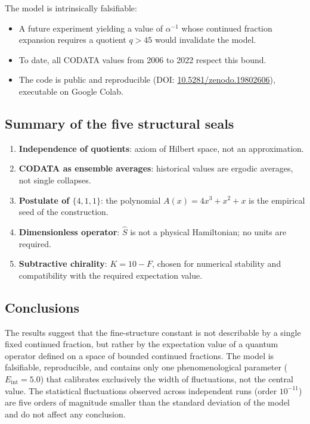 \documentclass[12pt]{article}
\begin{document}
The model is intrinsically falsifiable:

\begin{itemize}
    \item A future experiment yielding a value of $\alpha^{-1}$ whose continued fraction expansion requires a quotient $q > 45$ would invalidate the model.
    \item To date, all CODATA values from 2006 to 2022 respect this bound.
    \item The code is public and reproducible (DOI: \href{https://doi.org/10.5281/zenodo.19802606}{10.5281/zenodo.19802606}), executable on Google Colab.
\end{itemize}

\subsection*{Summary of the five structural seals}

\begin{enumerate}
    \item \textbf{Independence of quotients}: axiom of Hilbert space, not an approximation.
    \item \textbf{CODATA as ensemble averages}: historical values are ergodic averages, not single collapses.
    \item \textbf{Postulate of $\{4,1,1\}$}: the polynomial $A(x)=4x^3+x^2+x$ is the empirical seed of the construction.
    \item \textbf{Dimensionless operator}: $\hat S$ is not a physical Hamiltonian; no units are required.
    \item \textbf{Subtractive chirality}: $K = 10 - F$, chosen for numerical stability and compatibility with the required expectation value.
\end{enumerate}

\subsection*{Conclusions}

The results suggest that the fine-structure constant is not describable by a single fixed continued fraction, but rather by the expectation value of a quantum operator defined on a space of bounded continued fractions. The model is falsifiable, reproducible, and contains only one phenomenological parameter ($E_{\text{int}}=5.0$) that calibrates exclusively the width of fluctuations, not the central value. The statistical fluctuations observed across independent runs (order $10^{-11}$) are five orders of magnitude smaller than the standard deviation of the model and do not affect any conclusion.
\end{document}
